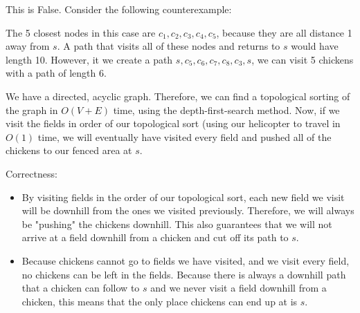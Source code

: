 \documentclass[12pt,twoside]{article}
\begin{document}
\begin{problems}
\begin{problemparts}
\problempart This is False. Consider the following counterexample:

\smallskip


\smallskip

The 5 closest nodes in this case are $c_1, c_2, c_3, c_4, c_5$, because they are all distance 1 away from $s$. A path that visits all of these nodes and returns to $s$ would have length 10. However, it we create a path $s, c_5, c_6, c_7, c_8, c_3, s$, we can visit 5 chickens with a path of length 6.

\problempart We have a directed, acyclic graph. Therefore, we can find a topological sorting of the graph in $O(V+E)$ time, using the depth-first-search method. Now, if we visit the fields in order of our topological sort (using our helicopter to travel in $O(1)$ time, we will eventually have visited every field and pushed all of the chickens to our fenced area at $s$. \\

\bigskip

Correctness:
\begin{itemize}
\item By visiting fields in the order of our topological sort, each new field we visit will be downhill from the ones we visited previously. Therefore, we will always be "pushing" the chickens downhill. This also guarantees that we will not arrive at a field downhill from a chicken and cut off its path to $s$.
\item Because chickens cannot go to fields we have visited, and we visit every field, no chickens can be left in the fields. Because there is always a downhill path that a chicken can follow to $s$ and we never visit a field downhill from a chicken, this means that the only place chickens can end up at is $s$.
\end{itemize}



\end{problemparts}
\end{problems}
\end{document}
